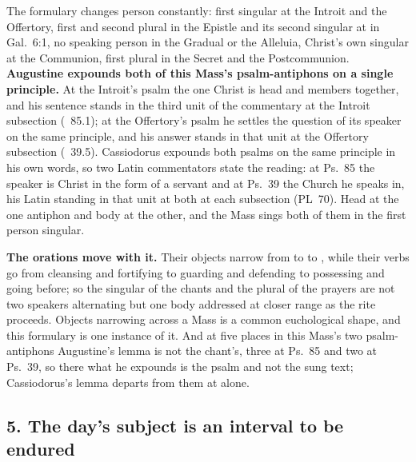 The formulary changes person constantly: first singular at the Introit and the
Offertory, first and second plural in the Epistle and its second singular at
 in Gal.\ 6:1, no speaking person in the
Gradual or the Alleluia, Christ's own singular at the Communion, first plural in
the Secret and the Postcommunion. \textbf{Augustine
expounds both of this Mass's psalm-antiphons on a single principle.} At the
Introit's psalm the one Christ is head and members together, and his sentence
stands
\ifdefined\TriptychSynthesisEdition
in the third unit of the commentary%
\else
at the Introit subsection%
\fi{} (~85.1); at the Offertory's psalm
he settles the question of its speaker on the same principle, and his answer
stands
\ifdefined\TriptychSynthesisEdition
in that unit%
\else
at the Offertory subsection%
\fi{} (~39.5). Cassiodorus expounds both
psalms on the same principle in his own words, so two Latin commentators state
the reading: at Ps.~85 the speaker is Christ in the form of a servant and at
Ps.~39 the Church he speaks in, his Latin standing
\ifdefined\TriptychSynthesisEdition
in that unit at both%
\else
at each subsection%
\fi{} (PL~70). Head
at the one antiphon and body at the other, and the Mass sings both of them in
the first person singular.

\textbf{The orations move with it.} Their objects narrow from  to  to , while their verbs go
from cleansing and fortifying to guarding and defending to possessing and going
before; so the singular of the chants and the plural of the prayers are not two
speakers alternating but one body addressed at closer range as the rite proceeds.
Objects narrowing across a Mass is a common euchological shape, and this formulary
is one instance of it. And at five places in this
Mass's two psalm-antiphons Augustine's lemma is not the chant's, three at Ps.~85
and two at Ps.~39, so there what he expounds is the psalm and not the sung text;
Cassiodorus's lemma departs from them at  alone.

\subsection*{5. The day's subject is an interval to be endured}


